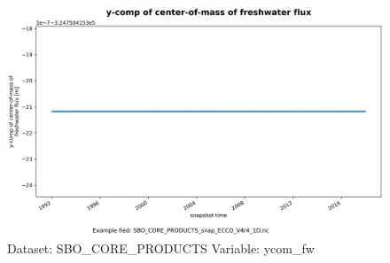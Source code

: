 \begin{figure}[H]
\centering
\includegraphics[scale=0.55]{../images/plots/oneD_plots/SBO_Core_Products/ycom_fw.png}
\caption{Dataset: SBO\_CORE\_PRODUCTS Variable: ycom\_fw}
\label{tab:table-SBO_CORE_PRODUCTS_ycom_fw-Plot}
\end{figure}
\pagebreak

